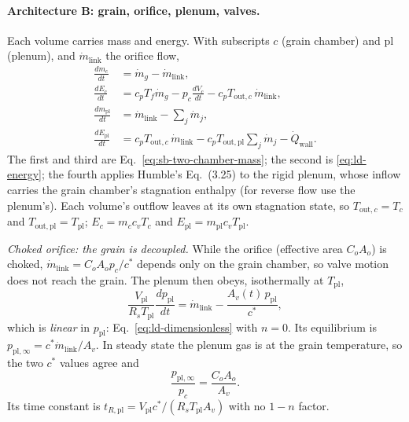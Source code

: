 \paragraph{Architecture B: grain, orifice, plenum, valves.} Each volume
carries mass and energy. With subscripts $c$ (grain chamber) and
$\mathrm{pl}$ (plenum), and $\dot m_{\mathrm{link}}$ the orifice flow,
\begin{align*}
 \frac{dm_c}{dt}&=\dot m_g-\dot m_{\mathrm{link}},\\
 \frac{dE_c}{dt}&=c_pT_f\dot m_g-p_c\frac{dV_c}{dt}
                -c_pT_{\mathrm{out},c}\,\dot m_{\mathrm{link}},\\
 \frac{dm_{\mathrm{pl}}}{dt}&=\dot m_{\mathrm{link}}-\sum_j\dot m_j,\\
 \frac{dE_{\mathrm{pl}}}{dt}&=c_pT_{\mathrm{out},c}\,\dot m_{\mathrm{link}}
   -c_pT_{\mathrm{out},\mathrm{pl}}\sum_j\dot m_j-\dot Q_{\mathrm{wall}} .
\end{align*}
The first and third are Eq.~\eqref{eq:sb-two-chamber-mass}; the
second is \eqref{eq:ld-energy}; the fourth applies Humble's Eq.~(3.25)
to the rigid plenum, whose inflow carries the grain chamber's
stagnation enthalpy (for reverse flow use the plenum's). Each volume's
outflow leaves at its own stagnation state, so
$T_{\mathrm{out},c}=T_c$ and $T_{\mathrm{out},\mathrm{pl}}=T_{\mathrm{pl}}$;
$E_c=m_cc_vT_c$ and $E_{\mathrm{pl}}=m_{\mathrm{pl}}c_vT_{\mathrm{pl}}$.

\emph{Choked orifice: the grain is decoupled.} While the orifice
(effective area $C_oA_o$) is choked,
$\dot m_{\mathrm{link}}=C_oA_op_c/c^*$ depends only on the grain
chamber, so valve motion does not reach the grain. The plenum then
obeys, isothermally at $T_{\mathrm{pl}}$,
\[
 \frac{V_{\mathrm{pl}}}{R_sT_{\mathrm{pl}}}\frac{dp_{\mathrm{pl}}}{dt}
 =\dot m_{\mathrm{link}}-\frac{A_v(t)\,p_{\mathrm{pl}}}{c^*},
\]
which is \emph{linear} in $p_{\mathrm{pl}}$: Eq.~\eqref{eq:ld-dimensionless}
with $n=0$. Its equilibrium is
$p_{\mathrm{pl},\infty}=c^*\dot m_{\mathrm{link}}/A_v$. In steady
state the plenum gas is at the grain temperature, so the two $c^*$
values agree and
\begin{equation}\label{eq:ld-plenum-ratio}
 \frac{p_{\mathrm{pl},\infty}}{p_c}=\frac{C_oA_o}{A_v}.
\end{equation}
Its time constant is $t_{R,\mathrm{pl}}=V_{\mathrm{pl}}c^*/(R_sT_{\mathrm{pl}}A_v)$
with no $1-n$ factor.

